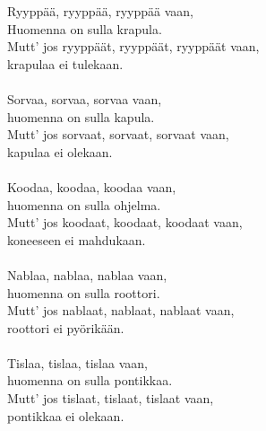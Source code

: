
            Ryyppää, ryyppää, ryyppää vaan, \\
            Huomenna on sulla krapula. \\
            Mutt’ jos ryyppäät, ryyppäät, ryyppäät vaan, \\
            krapulaa ei tulekaan. \\
\hspace{10mm} \\
            Sorvaa, sorvaa, sorvaa vaan, \\
            huomenna on sulla kapula. \\
            Mutt’ jos sorvaat, sorvaat, sorvaat vaan, \\
            kapulaa ei olekaan. \\
\hspace{10mm} \\
            Koodaa, koodaa, koodaa vaan, \\
            huomenna on sulla ohjelma. \\
            Mutt’ jos koodaat, koodaat, koodaat vaan, \\
            koneeseen ei mahdukaan. \\
\hspace{10mm} \\
            Nablaa, nablaa, nablaa vaan, \\
            huomenna on sulla roottori. \\
            Mutt’ jos nablaat, nablaat, nablaat vaan, \\
            roottori ei pyörikään. \\
\hspace{10mm} \\
            Tislaa, tislaa, tislaa vaan, \\
            huomenna on sulla pontikkaa. \\
            Mutt’ jos tislaat, tislaat, tislaat vaan, \\
            pontikkaa ei olekaan. \\
